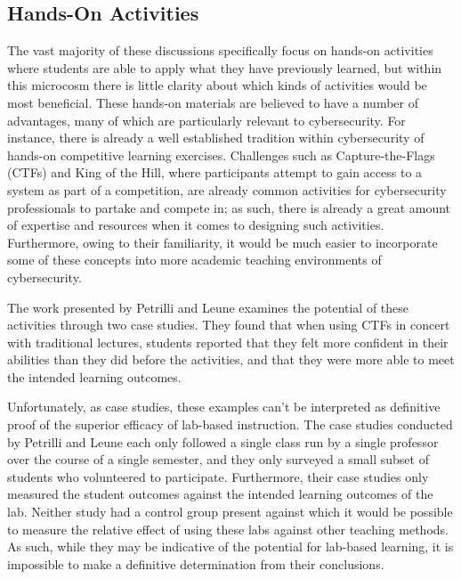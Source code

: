 \subsection{Hands-On Activities}

    The vast majority of these discussions specifically focus on hands-on activities where students are able to apply what they have previously learned, but within this microcosm there is little clarity about which kinds of activities would be most beneficial. These hands-on materials are believed to have a number of advantages, many of which are particularly relevant to cybersecurity. %
For instance, there is already a well established tradition within cybersecurity of hands-on competitive learning exercises. %
Challenges such as Capture-the-Flags (CTFs) and King of the Hill, where participants attempt to gain access to a system as part of a competition, are already common activities for cybersecurity professionals to partake and compete in; %
as such, there is already a great amount of expertise and resources when it comes to designing such activities. %
Furthermore, owing to their familiarity, it would be much easier to incorporate some of these concepts into more academic teaching environments of cybersecurity.

    The work presented by Petrilli and Leune examines the potential of these activities through two case studies. %
They found that when using CTFs in concert with traditional lectures, students reported that they felt more confident in their abilities than they did before the activities, and that they were more able to meet the intended learning outcomes. 

    Unfortunately, as case studies, these examples can't be interpreted as definitive proof of the superior efficacy of lab-based instruction. %
The case studies conducted by Petrilli and Leune each only followed a single class run by a single professor over the course of a single semester, and they only surveyed a small subset of students who volunteered to participate. 
    Furthermore, their case studies only measured the student outcomes against the intended learning outcomes of the lab. %
Neither study had a control group present against which it would be possible to measure the relative effect of using these labs against other teaching methods. %
As such, while they may be indicative of the potential for lab-based learning, it is impossible to make a definitive determination from their conclusions.

